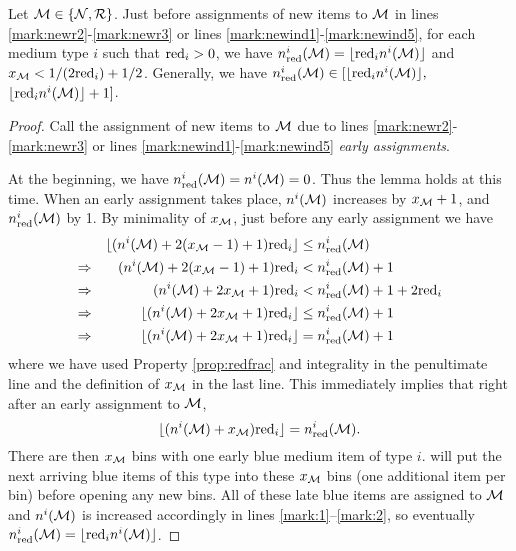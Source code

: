 \begin{lemma}
\label{lem:marksNR}
Let $\mathcal{M}\in\{\mathcal{N},\mathcal{R}\}$.
Just before assignments of new items to $\mathcal{M}$ in lines \ref{mark:newr2}-\ref{mark:newr3} or lines \ref{mark:newind1}-\ref{mark:newind5},
for each medium type $i$ such that $\mathrm{red}_i>0$,
we have $n_{\mathrm{red}}^i(\mathcal{M}) = \lfloor \mathrm{red}_i n^i(\mathcal{M})\rfloor$
and $x_{\mathcal{M}} < 1/(2\mathrm{red}_i)+1/2$. Generally, we have 
$n_{\mathrm{red}}^i(\mathcal{M}) \in [\lfloor \mathrm{red}_in^i(\mathcal{M})\rfloor,$ $\lfloor \mathrm{red}_in^i(\mathcal{M})\rfloor+1]$. 
\end{lemma}
\begin{proof}
Call the assignment of new items to $\mathcal{M}$ due to lines \ref{mark:newr2}-\ref{mark:newr3} or lines \ref{mark:newind1}-\ref{mark:newind5} \emph{early assignments}. 


At the beginning, we have $n_{\mathrm{red}}^i(\mathcal{M})=n^i(\mathcal{M})=0$.
Thus the lemma holds at this time.
When an early assignment takes place, 
$n^i(\mathcal{M})$ increases by $x_{\mathcal{M}}+1$, and $n_{\mathrm{red}}^i(\mathcal{M})$ by 1.
By minimality of $x_{\mathcal{M}}$, just before any early assignment we have
\begin{align}
\label{xbound1}
&&\lfloor (n^i(\mathcal{M})+ 2(x_{\mathcal{M}}-1)+1)\mathrm{red}_i\rfloor & \le n_{\mathrm{red}}^i(\mathcal{M})\\
\nonumber
\Rightarrow &&
(n^i(\mathcal{M})+ 2(x_{\mathcal{M}}-1)+1)\mathrm{red}_i &< n_{\mathrm{red}}^i(\mathcal{M}) +1\\
\nonumber
\Rightarrow &&
(n^i(\mathcal{M})+ 2 x_{\mathcal{M}}+1)\mathrm{red}_i &< n_{\mathrm{red}}^i(\mathcal{M}) +1 +2\mathrm{red}_i\\
\nonumber
\Rightarrow&&
\lfloor (n^i(\mathcal{M})+ 2x_{\mathcal{M}} +1)\mathrm{red}_i\rfloor&\le n_{\mathrm{red}}^i(\mathcal{M})+1\\
\nonumber
\Rightarrow&&
\lfloor (n^i(\mathcal{M})+ 2x_{\mathcal{M}} +1)\mathrm{red}_i\rfloor&= n_{\mathrm{red}}^i(\mathcal{M})+1
\end{align}
where we have used Property \ref{prop:redfrac} and integrality in the penultimate line and
the definition of $x_{\mathcal{M}}$ in the last line.
This immediately implies that right after an early assignment to $\mathcal{M}$,
\begin{equation}
\lfloor(n^i(\mathcal{M})+x_{\mathcal{M}}) \mathrm{red}_i\rfloor = n_{\mathrm{red}}^i(\mathcal{M}). \label{eq:mark-after-assign}
\end{equation}
There are then $x_{\mathcal{M}}$ bins with one early blue medium item of type $i$. 
{\EHarm} will put
the next arriving blue items of this type into these $x_{\mathcal{M}}$ bins (one additional item per bin) before opening any new bins.
All of these late blue items are assigned to $\mathcal{M}$ and $n^i(\mathcal{M})$ is increased accordingly in lines \ref{mark:1}--\ref{mark:2},
so eventually $n_{\mathrm{red}}^i(\mathcal{M}) = \lfloor \mathrm{red}_i n^i(\mathcal{M})\rfloor$.


\end{proof}
